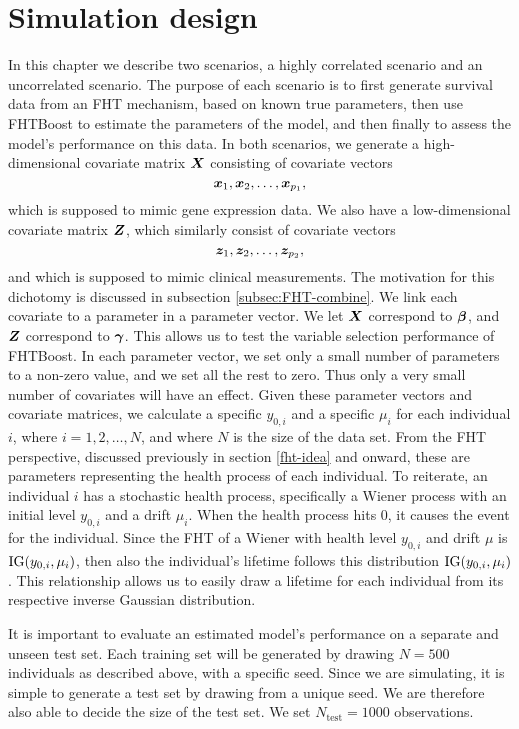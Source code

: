 \section{Simulation design}
In this chapter we describe two scenarios, a highly correlated scenario and an uncorrelated scenario. 
The purpose of each scenario is to first generate survival data from an FHT mechanism, based on known true parameters, then use FHTBoost to estimate the parameters of the model, and then finally to assess the model's performance on this data.
In both scenarios, we generate a high-dimensional covariate matrix $\bm{X}$ consisting of covariate vectors
\begin{equation}
    \bm{x}_1,\bm{x}_2,\ldots,\bm{x}_{p_1},
\end{equation}
which is supposed to mimic gene expression data.
We also have a low-dimensional covariate matrix $\bm{Z}$, which similarly consist of covariate vectors
\begin{equation}
    \bm{z}_1,\bm{z}_2,\ldots,\bm{z}_{p_2},
\end{equation}
and which is supposed to mimic clinical measurements.
The motivation for this dichotomy is discussed in subsection \ref{subsec:FHT-combine}.
We link each covariate to a parameter in a parameter vector.
We let $\bm{X}$ correspond to $\boldsymbol{\beta}$, and $\bm{Z}$ correspond to $\boldsymbol{\gamma}$.
This allows us to test the variable selection performance of FHTBoost.
In each parameter vector, we set only a small number of parameters to a non-zero value, and we set all the rest to zero.
Thus only a very small number of covariates will have an effect.
Given these parameter vectors and covariate matrices, we calculate a specific $y_{0,i}$ and a specific $\mu_i$ for each individual $i$, where $i=1,2,\ldots,N$, and where $N$ is the size of the data set.
From the FHT perspective, discussed previously in section \ref{fht-idea} and onward, these are parameters representing the health process of each individual.
To reiterate, an individual $i$ has a stochastic health process, specifically a Wiener process with an initial level $y_{0,i}$ and a drift $\mu_i$.
When the health process hits 0, it causes the event for the individual.
Since the FHT of a Wiener with health level $y_{0,i}$ and drift $\mu$ is $\operatorname{IG}(y_{0,i},\mu_i)$, then also the individual's lifetime follows this distribution $\operatorname{IG}(y_{0,i},\mu_i)$.
This relationship allows us to easily draw a lifetime for each individual from its respective inverse Gaussian distribution.

It is important to evaluate an estimated model's performance on a separate and unseen test set.
Each training set will be generated by drawing $N=500$ individuals as described above, with a specific seed.
Since we are simulating, it is simple to generate a test set by drawing from a unique seed.
We are therefore also able to decide the size of the test set.
We set $N_{\text{test}}=1000$ observations.

